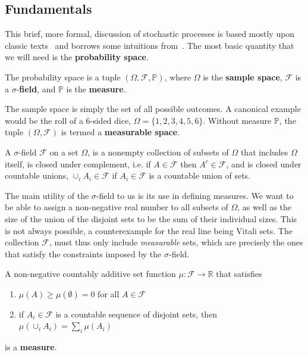 \subsection{Fundamentals}
This brief, more formal, discussion of stochastic processes is based mostly upon classic texts~\cite{durrett2019probability, rogers1994diffusions, rogers2000diffusions} and borrows some intuitions from~\cite{sarkka2019applied}. The most basic quantity that we will need is the \textbf{probability space}. 
\begin{definition}
	The probability space is a tuple $(\Omega, \mathcal{F}, \mathbb{P})$, where $\Omega$ is the \textbf{sample space}, $\mathcal{F}$ is a $\sigma$-\textbf{field}, and $\mathbb{P}$ is the \textbf{measure}.
\end{definition}
The sample space is simply the set of all possible outcomes. A canonical example would be the roll of a 6-sided dice, $\Omega=\{1, 2, 3, 4, 5, 6\}$. Without measure $\mathbb{P}$, the tuple $(\Omega, \mathcal{F})$ is termed a \textbf{measurable space}.
\begin{definition}
	A $\sigma$-field $\mathcal{F}$ on a set $\Omega$, is a nonempty collection of subsets of $\Omega$ that includes $\Omega$ itself, is closed under complement, i.e. if $A \in \mathcal{F}$ then $A^c \in \mathcal{F}$, and is closed under countable unions, $\cup_{i} A_{i} \in \mathcal{F}$ if $A_{i} \in \mathcal{F}$ is a countable union of sets.
\end{definition}
The main utility of the $\sigma$-field to us is its use in defining measures. We want to be able to assign a non-negative real number to all subsets of $\Omega$, as well as the size of the union of the disjoint sets to be the sum of their individual sizes. This is not always possible, a counterexample for the real line being Vitali sets. The collection $\mathcal{F}$, must thus only include \emph{measurable} sets, which are precisely the ones that satisfy the constraints imposed by the $\sigma$-field.
\begin{definition}[Measure]
	A non-negative countably additive set function $\mu: \mathcal{F} \rightarrow \mathbb{R}$ that satisfies
	\begin{enumerate}[label=\roman*)]
		\item $\mu(A) \geq \mu(\emptyset)=0$ for all $A \in \mathcal{F}$
		\item if $A_{i} \in \mathcal{F}$ is a countable sequence of disjoint sets, then $\mu\left(\cup_{i} A_{i}\right)=\sum_{i} \mu\left(A_{i}\right)$
	\end{enumerate}
	is a \textbf{measure}.
\end{definition}
